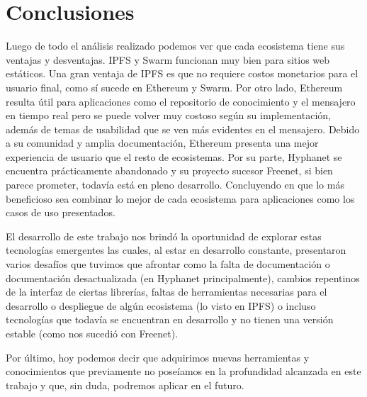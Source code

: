 \section{Conclusiones}

Luego de todo el análisis realizado podemos ver que cada ecosistema tiene sus ventajas y desventajas. IPFS y Swarm funcionan muy bien para sitios web estáticos. Una gran ventaja de IPFS es que no requiere costos monetarios para el usuario final, como sí sucede en Ethereum y Swarm. Por otro lado, Ethereum resulta útil para aplicaciones como el repositorio de conocimiento y el mensajero en tiempo real pero se puede volver muy costoso según su implementación, además de temas de usabilidad que se ven más evidentes en el mensajero. Debido a su comunidad y amplia documentación, Ethereum presenta una mejor experiencia de usuario que el resto de ecosistemas. Por su parte, Hyphanet se encuentra prácticamente abandonado y su proyecto sucesor Freenet, si bien parece prometer, todavía está en pleno desarrollo. Concluyendo en que lo más beneficioso sea combinar lo mejor de cada ecosistema para aplicaciones como los casos de uso presentados.

El desarrollo de este trabajo nos brindó la oportunidad de explorar estas tecnologías emergentes las cuales, al estar en desarrollo constante, presentaron varios desafíos que tuvimos que afrontar como la falta de documentación o documentación desactualizada (en Hyphanet principalmente), cambios repentinos de la interfaz de ciertas librerías, faltas de herramientas necesarias para el desarrollo o despliegue de algún ecosistema (lo visto en IPFS) o incluso tecnologías que todavía se encuentran en desarrollo y no tienen una versión estable (como nos sucedió con Freenet).

Por último, hoy podemos decir que adquirimos nuevas herramientas y conocimientos que previamente no poseíamos en la profundidad alcanzada en este trabajo y que, sin duda, podremos aplicar en el futuro.
















